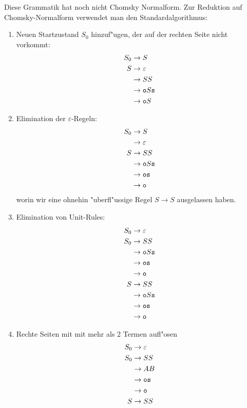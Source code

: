 \begin{loesung}
Diese Grammatik hat noch nicht Chomsky Normalform. Zur Reduktion auf
Chomsky-Normalform verwendet man den Standardalgorithmus:
\begin{enumerate}
\item Neuen Startzustand $S_0$ hinzuf"ugen, der auf der rechten Seite
nicht vorkommt:
\begin{align*}
S_0&\rightarrow S\\
S&\rightarrow \varepsilon\\
 &\rightarrow SS\\
 &\rightarrow {\tt o}S{\tt s}\\
 &\rightarrow {\tt o}S
\end{align*}
\item Elimination der $\varepsilon$-Regeln:
\begin{align*}
S_0&\rightarrow S\\
   &\rightarrow \varepsilon\\
S&\rightarrow SS\\
 &\rightarrow {\tt o}S{\tt s}\\
 &\rightarrow {\tt o}{\tt s}\\
 &\rightarrow {\tt o}
\end{align*}
worin wir eine ohnehin "uberfl"ussige Regel $S\rightarrow S$
ausgelassen haben.
\item Elimination von Unit-Rules:
\begin{align*}
S_0&\rightarrow \varepsilon\\
S_0&\rightarrow SS\\
   &\rightarrow {\tt o}S{\tt s}\\
   &\rightarrow {\tt o}{\tt s}\\
   &\rightarrow {\tt o}\\
S&\rightarrow SS\\
 &\rightarrow {\tt o}S{\tt s}\\
 &\rightarrow {\tt o}{\tt s}\\
 &\rightarrow {\tt o}
\end{align*}
\item Rechte Seiten mit mit mehr als 2 Termen aufl"osen
\begin{align*}
S_0&\rightarrow \varepsilon\\
S_0&\rightarrow SS\\
   &\rightarrow AB\\
   &\rightarrow {\tt o}{\tt s}\\
   &\rightarrow {\tt o}\\
S&\rightarrow SS\\

\end{align*}
\end{enumerate}
\end{loesung}
